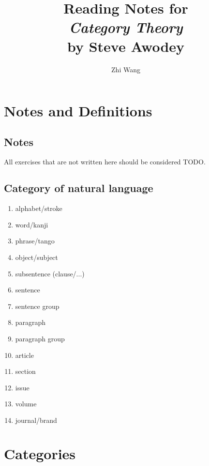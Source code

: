 \documentclass[12pt, letterpaper]{article}
\title{Reading Notes for \\ \large \textit{Category Theory} \\ by Steve Awodey}
\author{Zhi Wang}
\newcommand{\red}[1]{{\color{red} #1}}
\theoremstyle{definition}
\theoremstyle{remark}
\theoremstyle{definition}
\theoremstyle{plain}
\numberwithin{equation}{section}
\begin{document}
	
	\cleardoublepage
	
	\maketitle
	
	
	
	\renewcommand\thepage{\romannumeral\numexpr\value{page}\relax}
	
	\tableofcontents
	
	
	\cleardoublepage
	
	
	\section{Notes and Definitions}
	\subsection{Notes}
	All exercises that are not written here should be considered \red{TODO}.
	\subsection{Category of natural language}	
	\begin{enumerate}
		\item alphabet/stroke
		\item word/kanji
		\item phrase/tango
		\item object/subject
		\item subsentence (clause/...)
		\item sentence
		\item sentence group
		\item paragraph
		\item paragraph group
		\item article
		\item section
		\item issue
		\item volume
		\item journal/brand
	\end{enumerate}
	
	\section{Categories}
\end{document}
